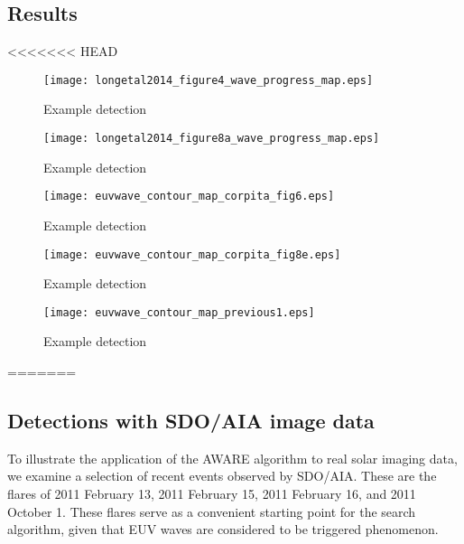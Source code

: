 \documentclass[referee,a4paper,12pt,traditabstract]{swsc}
\begin{document}
\begin{linenumbers}
\section{Results}\label{sec:results}

<<<<<<< HEAD
\begin{figure}
\begin{center}
\texttt{[image: longetal2014\_figure4\_wave\_progress\_map.eps]}

\caption{Example detection}
\label{corpita_fig4}
\end{center}
\end{figure}

\begin{figure}
\begin{center}
\texttt{[image: longetal2014\_figure8a\_wave\_progress\_map.eps]}
\caption{Example detection}
\label{corpita_fig8a}
\end{center}
\end{figure}

\begin{figure}
\begin{center}
\texttt{[image: euvwave\_contour\_map\_corpita\_fig6.eps]}
\caption{Example detection}
\label{corpita_fig6}
\end{center}
\end{figure}

\begin{figure}
\begin{center}
\texttt{[image: euvwave\_contour\_map\_corpita\_fig8e.eps]}
\caption{Example detection}
\label{corpita_fig8e}
\end{center}
\end{figure}

\begin{figure}
\begin{center}
\texttt{[image: euvwave\_contour\_map\_previous1.eps]}
\caption{Example detection}
\label{previous1}
\end{center}
\end{figure}
=======

\subsection{Detections with SDO/AIA image data}

To illustrate the application of the AWARE algorithm to real solar imaging data, we examine a selection of recent events observed by SDO/AIA. These are the flares of 2011 February 13, 2011 February 15, 2011 February 16, and 2011 October 1. These flares serve as a convenient starting point for the search algorithm, given that EUV waves are considered to be triggered phenomenon. 


\end{linenumbers}
\end{document}
